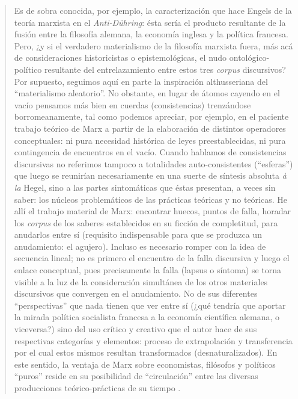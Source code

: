\begin{quote}
Es de sobra conocida, por ejemplo, la caracterización que hace Engels de la teoría marxista en el \emph{Anti-Dühring}: ésta sería el producto resultante de la fusión entre la filosofía alemana, la economía inglesa y la política francesa. Pero, ¿y si el verdadero materialismo de la filosofía marxista fuera, más acá de consideraciones historicistas o epistemológicas, el nudo ontológico-político resultante del entrelazamiento entre estos tres \emph{corpus} discursivos? Por supuesto, seguimos aquí en parte la inspiración althusseriana del \enquote{materialismo aleatorio}. No obstante, en lugar de átomos cayendo en el vacío pensamos más bien en cuerdas (consistencias) trenzándose borromeanamente, tal como podemos apreciar, por ejemplo, en el paciente trabajo teórico de Marx a partir de la elaboración de distintos operadores conceptuales: ni pura necesidad histórica de leyes preestablecidas, ni pura contingencia de encuentros en el vacío. Cuando hablamos de consistencias discursivas no referimos tampoco a totalidades auto-consistentes (\enquote{esferas}) que luego se reunirían necesariamente en una suerte de síntesis absoluta \emph{à la} Hegel, sino a las partes sintomáticas que éstas presentan, a veces sin saber: los núcleos problemáticos de las prácticas teóricas y no teóricas. He allí el trabajo material de Marx: encontrar huecos, puntos de falla, horadar los \emph{corpus} de los saberes establecidos en su ficción de completitud, para anudarlos entre sí (requisito indispensable para que se produzca un anudamiento: el agujero). Incluso es necesario romper con la idea de secuencia lineal; no es primero el encuentro de la falla discursiva y luego el enlace conceptual, pues precisamente la falla (lapsus o síntoma) se torna visible a la luz de la consideración simultánea de los otros materiales discursivos que convergen en el anudamiento. No de sus diferentes \enquote{perspectivas} que nada tienen que ver entre sí (¿qué tendría que aportar la mirada política socialista francesa a la economía científica alemana, o viceversa?) sino del uso crítico y creativo que el autor hace de sus respectivas categorías y elementos: proceso de extrapolación y transferencia por el cual estos mismos resultan transformados (desnaturalizados). En este sentido, la ventaja de Marx sobre economistas, filósofos y políticos \enquote{puros} reside en su posibilidad de \enquote{circulación}  entre las diversas producciones teórico-prácticas de su tiempo .


\end{quote}
